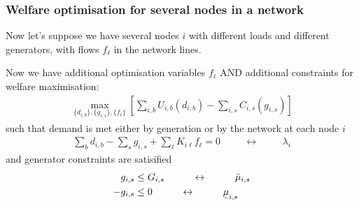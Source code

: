 \documentclass[10pt,dvipsnames]{beamer}
\def\l{\lambda}
\def\m{\mu}
\newcommand{\ubar}[1]{\text{\b{$#1$}}}
\begin{document}
\begin{frame}[fragile]
  \frametitle{Welfare optimisation for several nodes in a network}

  Now let's suppose we have several nodes $i$ with different loads and
  different generators, with flows $f_\ell$ in the network lines.

  Now we have additional optimisation variables $f_\ell$ AND
  additional constraints for welfare maximisation:
  \begin{align*}
    \max_{\{d_{i,b}\},\{g_{i,s}\},\{f_\ell\}}\left[\sum_{i,b} U_{i,b}(d_{i,b}) - \sum_{i,s} C_{i,s} (g_{i,s}) \right]
  \end{align*}
  such that demand is met either by generation or by the network at each node $i$
  \begin{align*}
    \sum_{b} d_{i,b} - \sum_{s} g_{i,s} +  \sum_\ell K_{i\ell}f_\ell  = 0 \hspace{1cm}\leftrightarrow\hspace{1cm} \l_i
  \end{align*}
  and generator constraints are satisified
    \begin{align*}
        g_{i,s}  & \leq  G_{i,s}  \hspace{1cm}\leftrightarrow\hspace{1cm} \bar{\m}_{i,s} \\
    - g_{i,s}  & \leq  0  \hspace{1cm}\leftrightarrow\hspace{1cm} \ubar{\m}_{i,s}
  \end{align*}



\end{frame}
\end{document}
